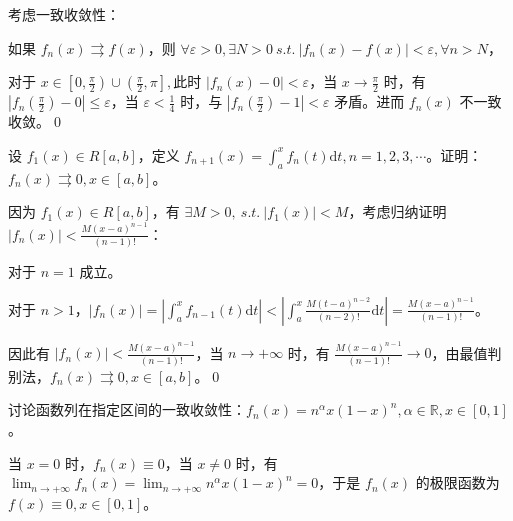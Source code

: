 考虑一致收敛性：

如果 $\displaystyle f_{n}( x) \rightrightarrows f( x)$，则 $\displaystyle \forall \varepsilon  >0,\exists N >0\ s.t.\ |f_{n}( x) -f( x) |< \varepsilon ,\forall n >N$，

对于 $\displaystyle x\in \left[ 0,\frac{\pi }{2}\right) \cup \left(\frac{\pi }{2} ,\pi \right] ,$此时 $\displaystyle |f_{n}( x) -0|< \varepsilon $，当 $\displaystyle x\rightarrow \frac{\pi }{2}$ 时，有 $\displaystyle |f_{n}\left(\frac{\pi }{2}\right) -0|\leqslant \varepsilon $，当 $\displaystyle \varepsilon < \frac{1}{4}$ 时，与 $\displaystyle |f_{n}\left(\frac{\pi }{2}\right) -1|< \varepsilon $ 矛盾。进而 $\displaystyle f_{n}( x)$ 不一致收敛。\qed 





\begin{ques}
	设 $\displaystyle f_{1}( x) \in R[ a,b]$，定义 $\displaystyle f_{n+1}( x) =\int _{a}^{x} f_{n}( t)\mathrm{d} t,n=1,2,3,\cdots $。证明：$\displaystyle f_{n}( x) \rightrightarrows 0,x\in [ a,b]$。
\end{ques}





因为 $\displaystyle f_{1}( x) \in R[ a,b]$，有 $\displaystyle \exists M >0,\ s.t.\ |f_{1}( x) |< M$，考虑归纳证明 $\displaystyle |f_{n}( x) |< \frac{M( x-a)^{n-1}}{( n-1) !}$：

对于 $\displaystyle n=1$ 成立。

对于 $\displaystyle n >1$，$\displaystyle |f_{n}( x) |=\left| \int _{a}^{x} f_{n-1}( t)\mathrm{d} t\right| < \left| \int _{a}^{x}\frac{M( t-a)^{n-2}}{( n-2) !}\mathrm{d} t\right| =\frac{M( x-a)^{n-1}}{( n-1) !}$。

因此有 $\displaystyle |f_{n}( x) |< \frac{M( x-a)^{n-1}}{( n-1) !}$，当 $\displaystyle n\rightarrow +\infty $ 时，有 $\displaystyle \frac{M( x-a)^{n-1}}{( n-1) !}\rightarrow 0$，由最值判别法，$\displaystyle f_{n}( x) \rightrightarrows 0,x\in [ a,b]$。\qed 









\begin{ques}
	讨论函数列在指定区间的一致收敛性：$\displaystyle f_{n}( x) =n^{\alpha } x( 1-x)^{n} ,\alpha \in \mathbb{R} ,x\in [ 0,1]$。
\end{ques}



当 $\displaystyle x=0$ 时，$\displaystyle f_{n}( x) \equiv 0$，当 $\displaystyle x\neq 0$ 时，有 $\displaystyle \lim _{n\rightarrow +\infty } f_{n}( x) =\lim _{n\rightarrow +\infty } n^{\alpha } x( 1-x)^{n} =0$，于是 $\displaystyle f_{n}( x)$ 的极限函数为 $\displaystyle f( x) \equiv 0,x\in [ 0,1]$。

